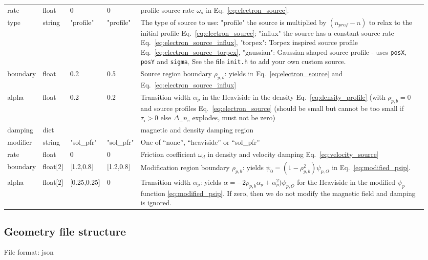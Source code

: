 \begin{longtable}{llllp{6cm}}
\qquad rate & float & 0    & 0 & profile source rate $\omega_s$ in Eq.~\eqref{eq:electron_source}.
\\
\qquad type & string & "profile" & "profile" & The type of source to use: "profile" the source is multiplied by $(n_{prof} - n)$ to relax to the initial profile Eq.~\eqref{eq:electron_source};
"influx" the source has a constant source rate Eq.~\eqref{eq:electron_source_influx},
"torpex": Torpex inspired source profile Eq.~\eqref{eq:electron_source_torpex},
"gaussian": Gaussian shaped source profile - uses \texttt{posX}, \texttt{posY} and \texttt{sigma},
    See the file {\tt init.h} to add your own custom source.
\\
\qquad boundary & float & 0.2  & 0.5 & Source region boundary $\rho_{p,b}$: yields in Eq.~\eqref{eq:electron_source} and Eq.~\eqref{eq:electron_source_influx}  \\
\qquad alpha  & float & 0.2 & 0.2 & Transition width $\alpha_p$ in the Heaviside
in the density Eq.~\eqref{eq:density_profile} (with $\rho_{p,b}=0$ and source profiles Eq.~\eqref{eq:electron_source} (should be
small but cannot be too small if $\tau_i > 0$ else $\Delta_\perp n_e$ explodes, must not be zero)
\\
damping & dict & & & magnetic and density damping region \\
\qquad modifier & string & "sol\_pfr" & "sol\_pfr" & One of ``none'', ``heaviside'' or ``sol\_pfr'' \\
\qquad rate & float & 0    & 0   & Friction coefficient $\omega_d$ in density and velocity damping Eq.~\eqref{eq:velocity_source} \\
\qquad boundary & float[2] & [1.2,0.8]  & [1.2,0.8] & Modification region boundary $\rho_{p,b}$: yields $\psi_0 = (1-\rho_{p,b}^2)\psi_{p,O}$ in Eq.~\eqref{eq:modified_psip}.
\\
\qquad alpha   & float[2] & [0.25,0.25] & 0 & Transition width $\alpha_p$: yields
$\alpha=-2\rho_{p,b}\alpha_p+\alpha_p^2)\psi_{p,O}$ for the Heaviside in the modified
$\psi_p$ function \eqref{eq:modified_psip}. If zero, then we do not modify the
magnetic field and damping is ignored.\\
\bottomrule
\end{longtable}
\subsection{Geometry file structure} \label{sec:geometry_file}
File format: json

